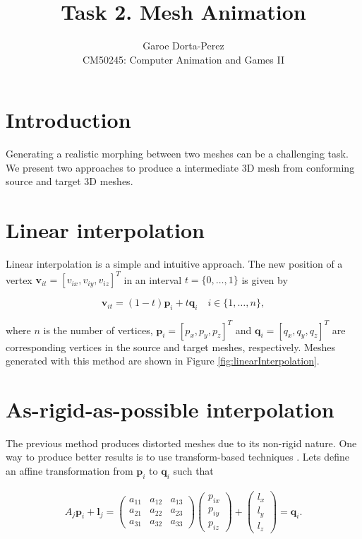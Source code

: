 \documentclass[12pt]{article}
\begin{document}
  
\title{Task 2. Mesh Animation}
\author{Garoe Dorta-Perez\\
CM50245: Computer Animation and Games II}
 
\maketitle
 
\section{Introduction}

Generating a realistic morphing between two meshes can be a challenging task.
We present two approaches to produce a intermediate 3D mesh from conforming source and target 3D meshes. 

\section{Linear interpolation}

Linear interpolation is a simple and intuitive approach.
The new position of a vertex $\mathbf{v}_{it} = \left[ v_{ix}, v_{iy}, v_{iz}\right]^T $ in an interval $t = \lbrace 0, \ldots, 1 \rbrace$ is given by

\begin{equation*}
\mathbf{v}_{it} = (1 - t) \mathbf{p}_i + t \mathbf{q}_i \quad i \in \lbrace 1, \ldots, n \rbrace,
\end{equation*}

where $n$ is the number of vertices, $\mathbf{p}_i = \left[ p_x, p_y, p_z\right]^T$ and $\mathbf{q}_i = \left[ q_x, q_y, q_z\right]^T$ are corresponding vertices in the source and target meshes, respectively.
Meshes generated with this method are shown in Figure \ref{fig:linearInterpolation}.

\section{As-rigid-as-possible interpolation}

The previous method produces distorted meshes due to its non-rigid nature.
One way to produce better results is to use transform-based techniques \cite{Alexa2000}.
Lets define an affine transformation from $\mathbf{p}_i$ to $\mathbf{q}_i$ such that

\begin{align*}
A_j \mathbf{p}_i + \mathbf{l}_j = \begin{pmatrix}
 a_{11} & a_{12} & a_{13} \\ 
 a_{21} & a_{22} & a_{23} \\ 
 a_{31} & a_{32}  & a_{33} 
\end{pmatrix} 
\begin{pmatrix}
 p_{ix} \\ 
 p_{iy} \\ 
 p_{iz} 
\end{pmatrix} +
\begin{pmatrix}
 l_x \\ 
 l_y \\ 
 l_z
\end{pmatrix} = \mathbf{q}_i.
\end{align*}
\end{document}
